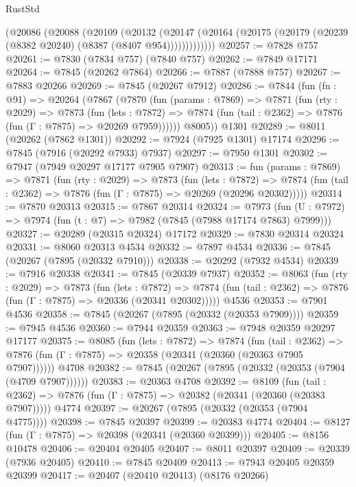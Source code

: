 \begin{lexlean}{RustStd}
\begin{coremodule}
        (@20086
          (@20088
            (@20109
              (@20132
                (@20147
                  (@20164 (@20175 (@20179 (@20239 (@8382 @20240) (@8387 (@8407 @954)))))))))))))
@20257 := @7828 @757
@20261 := @7830 (@7834 @757) (@7840 @757)
@20262 := @7849 @17171
@20264 := @7845 (@20262 @7864)
@20266 := @7887 (@7888 @757)
@20267 := @7883 @20266
@20269 := @7845 (@20267 @7912)
@20286 := @7844
    (fun (fn : @91) =>
    @20264
      (@7867
        (@7870
          (fun (params : @7869) =>
          @7871
            (fun (rty : @2029) =>
            @7873
              (fun (lets : @7872) =>
              @7874 (fun (tail : @2362) => @7876 (fun (Γ : @7875) => @20269 @7959))))))
        @8005))
    @1301
@20289 := @8011 (@20262 (@7862 @1301))
@20292 := @7924 (@7925 @1301) @17174
@20296 := @7845 (@7916 (@20292 @7933) @7937)
@20297 := @7950 @1301
@20302 := @7947 (@7949 @20297 @17177 @7905 @7907)
@20313 := fun (params : @7869) =>
  @7871
    (fun (rty : @2029) =>
    @7873
      (fun (lets : @7872) =>
      @7874 (fun (tail : @2362) => @7876 (fun (Γ : @7875) => @20269 (@20296 @20302)))))
@20314 := @7870 @20313
@20315 := @7867 @20314
@20324 := @7973
    (fun (U : @7972) => @7974 (fun (t : @7) => @7982 (@7845 (@7988 @17174 @7863) @7999)))
@20327 := @20289 (@20315 @20324) @17172
@20329 := @7830 @20314 @20324
@20331 := @8060 @20313 @4534
@20332 := @7897 @4534
@20336 := @7845 (@20267 (@7895 (@20332 @7910)))
@20338 := @20292 (@7932 @4534)
@20339 := @7916 @20338
@20341 := @7845 (@20339 @7937)
@20352 := @8063
    (fun (rty : @2029) =>
    @7873
      (fun (lets : @7872) =>
      @7874 (fun (tail : @2362) => @7876 (fun (Γ : @7875) => @20336 (@20341 @20302)))))
    @4536
@20353 := @7901 @4536
@20358 := @7845 (@20267 (@7895 (@20332 (@20353 @7909))))
@20359 := @7945 @4536
@20360 := @7944 @20359
@20363 := @7948 @20359 @20297 @17177
@20375 := @8085
    (fun (lets : @7872) =>
    @7874
      (fun (tail : @2362) =>
      @7876 (fun (Γ : @7875) => @20358 (@20341 (@20360 (@20363 @7905 @7907))))))
    @4708
@20382 := @7845 (@20267 (@7895 (@20332 (@20353 (@7904 (@4709 @7907))))))
@20383 := @20363 @4708
@20392 := @8109
    (fun (tail : @2362) => @7876 (fun (Γ : @7875) => @20382 (@20341 (@20360 (@20383 @7907)))))
    @4774
@20397 := @20267 (@7895 (@20332 (@20353 (@7904 @4775))))
@20398 := @7845 @20397
@20399 := @20383 @4774
@20404 := @8127 (fun (Γ : @7875) => @20398 (@20341 (@20360 @20399)))
@20405 := @8156 @10478
@20406 := @20404 @20405
@20407 := @8011 @20397
@20409 := @20339 (@7936 @20405)
@20410 := @7845 @20409
@20413 := @7943 @20405 @20359 @20399
@20417 := @20407 (@20410 @20413) (@8176 @20266)

\end{coremodule}
\end{lexlean}
